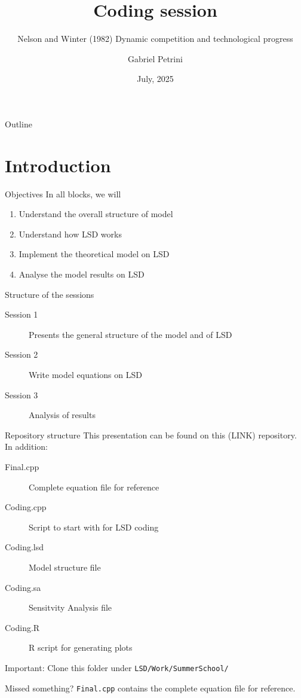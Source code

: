 \documentclass[bigger,aspectratio=169]{beamer}
\author{Gabriel Petrini}
\date{July, 2025}
\title{Coding session}
\subtitle{Nelson and Winter (1982) Dynamic competition and technological progress}
\begin{document}
\maketitle
\begin{frame}{Outline}
\tableofcontents
\end{frame}

\section{Introduction}
\label{sec:org67fa2fa}

\begin{frame}[label={sec:org552cf5e}]{Objectives}
In all blocks, we will

\begin{enumerate}
\item Understand the overall structure of \textcite{dosi_2017_footprint}  model
\item Understand how LSD works
\item Implement the theoretical model on LSD
\item Analyse the model results on LSD
\end{enumerate}
\end{frame}
\begin{frame}[label={sec:orga1b0e06}]{Structure of the sessions}
\begin{description}
\item[{Session 1}] Presents the general structure of the model and of LSD
\item[{Session 2}] Write model equations on LSD
\item[{Session 3}] Analysis of results
\end{description}
\end{frame}
\begin{frame}[label={sec:orgdda7615},fragile]{Repository structure}
 This presentation can be found on this (LINK) repository. In addition:

\begin{description}
\item[{Final.cpp}] Complete equation file for reference
\item[{Coding.cpp}] Script to start with for LSD coding
\item[{Coding.lsd}] Model structure file
\item[{Coding.sa}] Sensitvity Analysis file
\item[{Coding.R}] R script for generating plots
\end{description}

\alert{Important:} Clone this folder under \texttt{LSD/Work/SummerSchool/}
\begin{block}{Missed something?}
\texttt{Final.cpp} contains the complete equation file for reference.
\end{block}
\end{frame}
\end{document}
